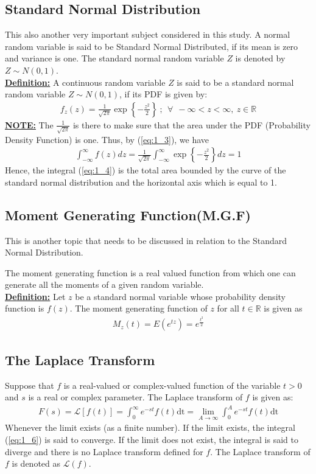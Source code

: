 \documentclass[11pt]{report}
\newcommand{\ubt}[1]{\textbf{\underline{#1}}}
\newcommand{\refn}[1]{(\ref{#1})}
\newcommand{\refx}[1]{\refn{eq:#1}}
\newcommand{\dsp}{\displaystyle}
\newcommand{\real}{ \mathbb{R}}
\newcommand{\Laplace}{\mathcal{L}}
\newcommand{\ft}{f(t)}
\newcommand{\LaplaceIntegral}{\int_{0}^{\infty}e^{-st}\ft\text{dt}}
\newcommand{\LFt}{\Laplace \sbracket{\ft}}
\newcommand{\sbracket}[1]{\left[#1\right]}
\begin{document}
	\subsection{Standard Normal Distribution}
	This also another very important subject considered in this study. A normal random variable is said to be Standard Normal Distributed, if its mean is zero and variance is one. The standard normal random variable $Z$ is denoted by $Z\sim N(0,1)$.\\
	\ubt{Definition:} A continuous random variable $Z$ is said to be a standard normal random variable $Z\sim N(0,1)$, if its PDF is given by:
	\begin{eqnarray}
		f_z(z) = \frac{1}{\sqrt{2\pi}} \exp\left\{-\frac{z^2}{2}\right\}~;~~ \forall~~ -\infty < z < \infty, ~ z \in \real\label{eq:1_3}
	\end{eqnarray}
	\ubt{NOTE:} The $\dsp \frac{1}{\sqrt{2\pi}}$ is there to make sure that the area under the PDF (Probability Density Function) is one. Thus, by \refx{1_3}, we have
	\begin{eqnarray}
		\int_{-\infty}^\infty f(z)dz =  \frac{1}{\sqrt{2\pi}}\int_{-\infty}^\infty \exp\left\{-\frac{z^2}{2}\right\}dz = 1\label{eq:1_4}
	\end{eqnarray}
	Hence, the integral \refx{1_4} is the total area bounded by the curve of the standard normal distribution and the horizontal axis which is equal to 1.
	
	\subsection{Moment Generating Function(M.G.F)}
	\label{sec:1_7_3}
	This is another topic that needs to be discussed in relation to the Standard Normal Distribution.
	
	The moment generating function is a real valued function from which one can generate all the moments of a given random variable.\\
	\ubt{Definition:} Let $z$ be a standard normal variable whose probability density function is $f(z)$. The moment generating function of $z$ for all $t\in \real$ is given as
	\begin{eqnarray}
		M_z(t) = E\left(e^{tz}\right) = e^{\frac{t^2}{2}}\label{eq:1_5}
	\end{eqnarray}
	
	\subsection{The Laplace Transform}
	\label{sec:1_7_4}
	Suppose that $f$ is a real-valued or complex-valued function of the variable $t>0$ and $s$ is a real or complex parameter. The Laplace transform of $f$ is given as:
	\begin{eqnarray}
		F(s) = \LFt = \LaplaceIntegral = \lim\limits_{A\rightarrow \infty}\int_0^A e^{-st}f(t)\text{dt}\label{eq:1_6}
	\end{eqnarray}
	Whenever the limit exists (as a finite number). If the limit exists, the integral \refx{1_6} is said to converge. If the limit does not exist, the integral is said to diverge and there is no Laplace transform defined for $f$. The Laplace transform of $f$ is denoted as $\Laplace(f)$.
	
\end{document}
